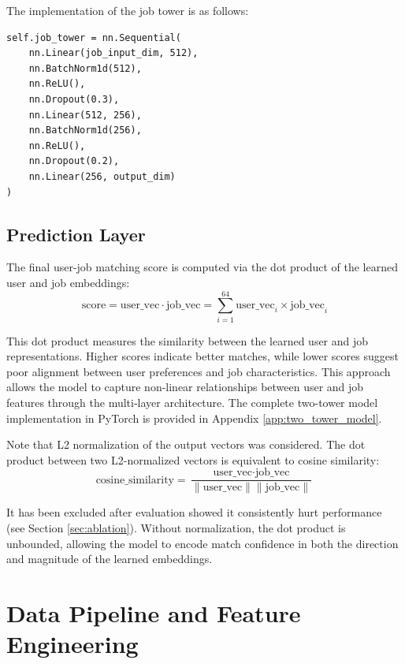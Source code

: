 The implementation of the job tower is as follows:

\begin{listing}[H]
\begin{verbatim}
self.job_tower = nn.Sequential(
    nn.Linear(job_input_dim, 512),
    nn.BatchNorm1d(512),
    nn.ReLU(),
    nn.Dropout(0.3),
    nn.Linear(512, 256),
    nn.BatchNorm1d(256),
    nn.ReLU(),
    nn.Dropout(0.2),
    nn.Linear(256, output_dim)
)
\end{verbatim}
\caption{Job tower architecture in the two-tower model}
\label{lst:job_tower}
\end{listing}

\subsection{Prediction Layer}
\label{sec:user_prediction}

The final user-job matching score is computed via the dot product of the learned user and job embeddings:
\begin{equation}
\text{score} = \text{user\_vec} \cdot \text{job\_vec} = \sum_{i=1}^{64} \text{user\_vec}_i \times \text{job\_vec}_i
\end{equation}

This dot product measures the similarity between the learned user and job representations. Higher scores indicate better matches, while lower scores suggest poor alignment between user preferences and job characteristics. This approach allows the model to capture non-linear relationships between user and job features through the multi-layer architecture. The complete two-tower model implementation in PyTorch is provided in Appendix \ref{app:two_tower_model}.

Note that L2 normalization of the output vectors was considered. The dot product between two L2-normalized vectors is equivalent to cosine similarity:
\begin{equation}
\text{cosine\_similarity} = \frac{\text{user\_vec} \cdot \text{job\_vec}}{\|\text{user\_vec}\| \|\text{job\_vec}\|}
\end{equation}

It has been excluded after evaluation showed it consistently hurt performance (see Section \ref{sec:ablation}). Without normalization, the dot product is unbounded, allowing the model to encode match confidence in both the direction and magnitude of the learned embeddings.

\section{Data Pipeline and Feature Engineering}
\label{sec:user_data_pipeline}

